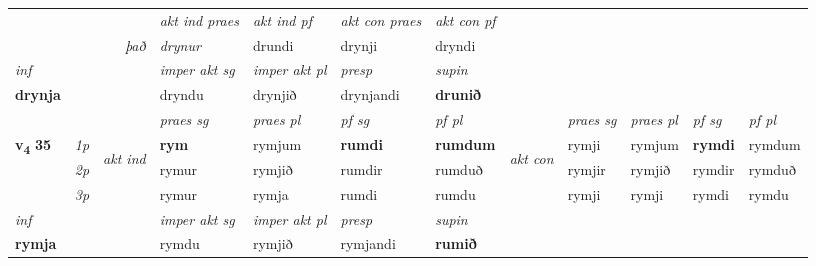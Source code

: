 \begin{longtable}[l]{X>{\footnotesize\itshape}llXXXXlXXXX}
   && &  \textit{akt ind praes} & \textit{akt ind pf} & \textit{akt con praes} & \textit{akt con pf} \\*
\multicolumn{3}{r}{\textit{það}} & drynur & drundi & drynji & dryndi \\*

\cmidrule{4-7}
   {\textit{inf}} & &  & \textit{imper akt sg} & \textit{imper akt pl}   & \textit{presp} & \textit{supin}   \\*
  {\textbf{drynja}} & && dryndu  & drynjið   & drynjandi &  \textbf{drunið}   \\*

\midrule

 & &   & \textit{praes sg}  & \textit{praes pl}    & \textit{ pf sg} & \textit{pf pl} & & \textit{praes sg}  & \textit{praes pl}    & \textit{pf sg} & \textit{pf pl }  \\ \cmidrule{4-7} \cmidrule{9-12}
 \multirow{2}{*}{{{\textbf{v{\textsubscript{4}}} \Large{\textbf{35}}}}}  & 1p & \multirow{3}{*}{\begin{turn}{90}\textit{akt ind}\end{turn}} & \textbf{rym} & rymjum & \textbf{rumdi} & \textbf{rumdum} & \multirow{3}{*}{\begin{turn}{90}\textit{akt con}\end{turn}} &rymji & rymjum & \textbf{rymdi} & rymdum\\*
 & 2p &  &  rymur  & rymjið & rumdir & rumduð & & rymjir & rymjið & rymdir & rymduð \\*
 & 3p &  & rymur & rymja & rumdi & rumdu & & rymji & rymji& rymdi & rymdu \\*
\cmidrule{4-7} \cmidrule{9-12}

   {\textit{inf}} & &  & \textit{imper akt sg} & \textit{imper akt pl}   & \textit{presp} & \textit{supin}   \\*
  {\textbf{rymja}} & && rymdu  & rymjið   & rymjandi &  \textbf{rumið}   \\*

\midrule


\end{longtable}
